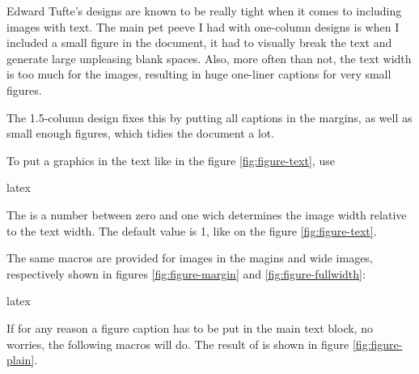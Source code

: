 \documentclass[raggedright, twoside, 11pt]{tufte-style-article}
\begin{document}
Edward Tufte's designs are known to be really tight when it comes to including images with text. The main pet peeve I had with one-column designs is when I included a small figure in the document, it had to visually break the text and generate large unpleasing blank spaces. Also, more often than not, the text width is too much for the images, resulting in huge one-liner captions for very small figures.

The 1.5-column design fixes this by putting all captions in the margins, as well as small enough figures, which tidies the document a lot.
	


To put a graphics in the text like in the figure \ref{fig:figure-text}, use
\begin{codebox}{latex}
\end{codebox}
The  is a number between zero and one wich determines the image width relative to the text width. The default value is 1, like on the figure \ref{fig:figure-text}.

The same macros are provided for images in the magins and wide images, respectively shown in figures \ref{fig:figure-margin} and \ref{fig:figure-fullwidth}:
\begin{codebox}{latex}
\end{codebox}



If for any reason a figure caption has to be put in the main text block, no worries, the following macros will do. The result of  is shown in figure \ref{fig:figure-plain}.
\end{document}
